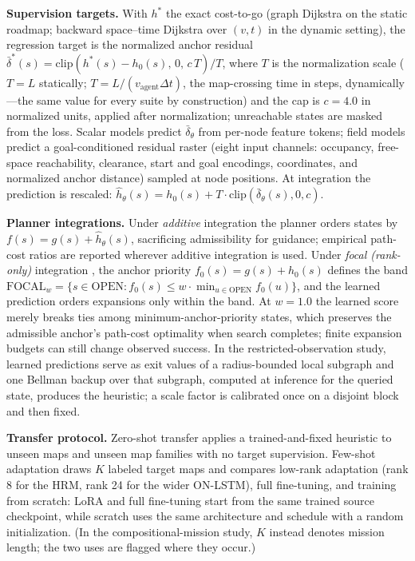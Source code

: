 \documentclass[letterpaper]{article} %
\begin{document}
\textbf{Supervision targets.} With $h^{*}$ the exact cost-to-go (graph Dijkstra on the static roadmap; backward space--time Dijkstra over $(v,t)$ in the dynamic setting), the regression target is the normalized anchor residual $\bar\delta^{*}(s) = \mathrm{clip}\!\left(h^{*}(s) - h_0(s),\, 0,\, c\,T\right)/T$, where $T$ is the normalization scale ($T{=}L$ statically; $T = L/(v_{\mathrm{agent}}\Delta t)$, the map-crossing time in steps, dynamically---the same value for every suite by construction) and the cap is $c{=}4.0$ in normalized units, applied after normalization; unreachable states are masked from the loss. Scalar models predict $\bar\delta_\theta$ from per-node feature tokens; field models predict a goal-conditioned residual raster (eight input channels: occupancy, free-space reachability, clearance, start and goal encodings, coordinates, and normalized anchor distance) sampled at node positions. At integration the prediction is rescaled: $\hat h_\theta(s) = h_0(s) + T \cdot \mathrm{clip}(\bar\delta_\theta(s), 0, c)$.

\textbf{Planner integrations.} Under \emph{additive} integration the planner orders states by $f(s) = g(s) + \hat h_\theta(s)$, sacrificing admissibility for guidance; empirical path-cost ratios are reported wherever additive integration is used. Under \emph{focal (rank-only)} integration \citep{pohl1970,pearl1982semiadmissible}, the anchor priority $f_0(s) = g(s) + h_0(s)$ defines the band $\mathrm{FOCAL}_w = \{ s \in \mathrm{OPEN} : f_0(s) \leq w \cdot \min_{u \in \mathrm{OPEN}} f_0(u) \}$, and the learned prediction orders expansions only within the band. At $w{=}1.0$ the learned score merely breaks ties among minimum-anchor-priority states, which preserves the admissible anchor's path-cost optimality when search completes; finite expansion budgets can still change observed success. In the restricted-observation study, learned predictions serve as exit values of a radius-bounded local subgraph and one Bellman backup over that subgraph, computed at inference for the queried state, produces the heuristic; a scale factor is calibrated once on a disjoint block and then fixed.

\textbf{Transfer protocol.} Zero-shot transfer applies a trained-and-fixed heuristic to unseen maps and unseen map families with no target supervision. Few-shot adaptation draws $K$ labeled target maps and compares low-rank adaptation \citep[LoRA;][]{hu2021lora} (rank 8 for the HRM, rank 24 for the wider ON-LSTM), full fine-tuning, and training from scratch: LoRA and full fine-tuning start from the same trained source checkpoint, while scratch uses the same architecture and schedule with a random initialization. (In the compositional-mission study, $K$ instead denotes mission length; the two uses are flagged where they occur.)
\end{document}
